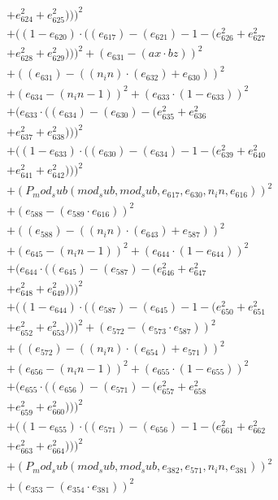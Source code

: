 \documentclass[10pt, a4paper]{article}
\begin{document}
\begin{small}
\begin{align*}
& + e_{624}^{2} + e_{625}^{2})))^{2} \\
& + ((1 - e_{620})  \cdot  ((e_{617}) - (e_{621}) - 1 - (e_{626}^{2} + e_{627}^{2} \\
& + e_{628}^{2} + e_{629}^{2})))^{2} + (e_{631} - (ax  \cdot  bz))^{2} \\
& + ((e_{631}) - ((n_in)  \cdot  (e_{632}) + e_{630}))^{2} \\
& + (e_{634} - (n_in - 1))^{2} + (e_{633}  \cdot  (1 - e_{633}))^{2} \\
& + (e_{633}  \cdot  ((e_{634}) - (e_{630}) - (e_{635}^{2} + e_{636}^{2} \\
& + e_{637}^{2} + e_{638}^{2})))^{2} \\
& + ((1 - e_{633})  \cdot  ((e_{630}) - (e_{634}) - 1 - (e_{639}^{2} + e_{640}^{2} \\
& + e_{641}^{2} + e_{642}^{2})))^{2} \\
& + (P_mod_sub(mod_sub, mod_sub, e_{617}, e_{630}, n_in, e_{616}))^{2} \\
& + (e_{588} - (e_{589}  \cdot  e_{616}))^{2} \\
& + ((e_{588}) - ((n_in)  \cdot  (e_{643}) + e_{587}))^{2} \\
& + (e_{645} - (n_in - 1))^{2} + (e_{644}  \cdot  (1 - e_{644}))^{2} \\
& + (e_{644}  \cdot  ((e_{645}) - (e_{587}) - (e_{646}^{2} + e_{647}^{2} \\
& + e_{648}^{2} + e_{649}^{2})))^{2} \\
& + ((1 - e_{644})  \cdot  ((e_{587}) - (e_{645}) - 1 - (e_{650}^{2} + e_{651}^{2} \\
& + e_{652}^{2} + e_{653}^{2})))^{2} + (e_{572} - (e_{573}  \cdot  e_{587}))^{2} \\
& + ((e_{572}) - ((n_in)  \cdot  (e_{654}) + e_{571}))^{2} \\
& + (e_{656} - (n_in - 1))^{2} + (e_{655}  \cdot  (1 - e_{655}))^{2} \\
& + (e_{655}  \cdot  ((e_{656}) - (e_{571}) - (e_{657}^{2} + e_{658}^{2} \\
& + e_{659}^{2} + e_{660}^{2})))^{2} \\
& + ((1 - e_{655})  \cdot  ((e_{571}) - (e_{656}) - 1 - (e_{661}^{2} + e_{662}^{2} \\
& + e_{663}^{2} + e_{664}^{2})))^{2} \\
& + (P_mod_sub(mod_sub, mod_sub, e_{382}, e_{571}, n_in, e_{381}))^{2} \\
& + (e_{353} - (e_{354}  \cdot  e_{381}))^{2} \\

\end{align*}
\end{small}
\end{document}
